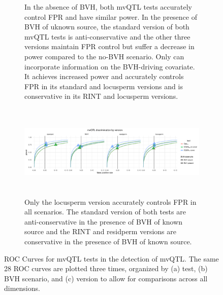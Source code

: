 \begin{figure}[ht]
\begin{subfigure}{\textwidth}
          \caption{
          In the absence of BVH, both mvQTL tests accurately control FPR and have similar power.
          In the presence of BVH of uknown source, the standard version of both mvQTL tests is anti-conservative and the other three versions maintain FPR control but suffer a decrease in power compared to the no-BVH scenario.
          Only \DGLMmv can incorporate information on the BVH-driving covariate.
          It achieves increased power and accurately controls FPR in its standard and locusperm versions and is conservative in its RINT and locusperm versions.
          }
      \vspace*{0.5cm}
      \end{subfigure}
      \begin{subfigure}{\textwidth}
          \centering
          \includegraphics[height = 4.5cm]{images/rocs_mvqtl_all_facet_by_eval.pdf}
          \caption{
          Only the locusperm version accurately controls FPR in all scenarios.
          The standard version of both tests are anti-conservative in the presence of BVH of known source and the RINT and residperm versions are conservative in \DGLMmv the presence of BVH of known source.
          }
      \end{subfigure}
      \caption[
        ROC Curves for mvQTL tests in the detection of mvQTL.
      ]
      {
        ROC Curves for mvQTL tests in the detection of mvQTL.
        The same 28 ROC curves are plotted three times, organized by (a) test, (b) BVH scenario, and (c) version to allow for comparisons across all dimensions.
      }
      \label{fig:mvqtl_rocs_supp}
  \end{figure}

\FloatBarrier
\clearpage
